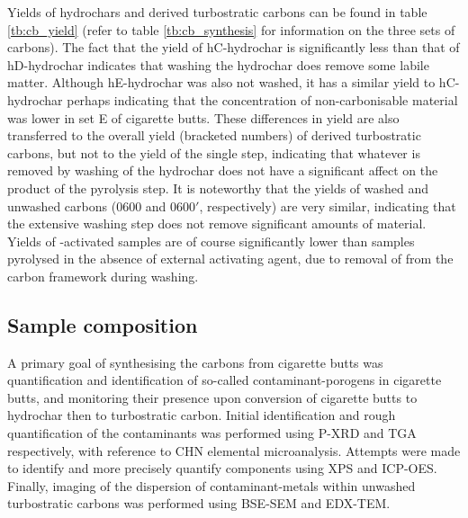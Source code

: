 Yields of hydrochars and derived turbostratic carbons can be found in table \ref{tb:cb_yield} (refer to table \ref{tb:cb_synthesis} for information on the three sets of carbons). The fact that the yield of hC-hydrochar is significantly less than that of hD-hydrochar indicates that washing the hydrochar does remove some labile matter. Although hE-hydrochar was also not washed, it has a similar yield to hC-hydrochar perhaps indicating that the concentration of non-carbonisable material was lower in set E of cigarette butts. These differences in yield are also transferred to the overall yield (bracketed numbers) of derived turbostratic carbons, but not to the yield of the single step, indicating that whatever is removed by washing of the hydrochar does not have a significant affect on the product of the pyrolysis step. It is noteworthy that the yields of washed and unwashed carbons (0600 and 0600$'$, respectively) are very similar, indicating that the extensive washing step does not remove significant amounts of material. Yields of -activated samples are of course significantly lower than samples pyrolysed in the absence of external activating agent, due to removal of  from the carbon framework during washing.


\subsection{Sample composition}

A primary goal of synthesising the carbons from cigarette butts was quantification and identification of so-called contaminant-porogens in cigarette butts, and monitoring their presence upon conversion of cigarette butts to hydrochar then to turbostratic carbon. Initial identification and rough quantification of the contaminants was performed using P-XRD and TGA respectively, with reference to CHN elemental microanalysis. Attempts were made to identify and more precisely quantify components using XPS and ICP-OES. Finally, imaging of the dispersion of contaminant-metals within unwashed turbostratic carbons was performed using BSE-SEM and EDX-TEM.

